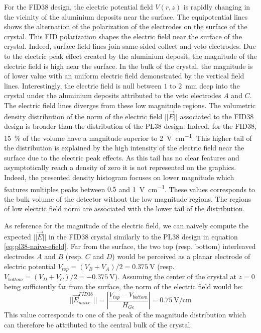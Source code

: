 For the FID38 design, the electric potential field $V(r,z)$ is rapidly changing in the vicinity of the aluminium deposits near the surface. The equipotential lines shows the alternation of the polarization of the electrodes on the surface of the crystal. This FID polarization shapes the electric field near the surface of the crystal. Indeed, surface field lines join same-sided collect and veto electrodes. Due to the electric peak effect created by the aluminium deposit, the magnitude of the electric field is high near the surface. In the bulk of the crystal, the magnitude is of lower value with an uniform electric field demonstrated by the vertical field lines. Interestingly, the electric field is null between $1$ to \SI{2}{\mm} deep into the crystal under the aluminium deposits attributed to the veto electrodes $A$ and $C$. The electric field lines diverges from these low magnitude regions.
The volumetric density distribution of the norm of the electric field $||\vec{E}||$ associated to the FID38 design is broader than the distribution of the PL38 design. Indeed, for the FID38, \SI{15}{\percent} of the volume have a magnitude superior to \SI{2}{\volt\per\cm}. This higher tail of the distribution is explained by the high intensity of the electric field near the surface due to the electric peak effects. As this tail has no clear features and asymptotically reach a density of zero it is not represented on the graphics. Indeed, the presented density histogram focuses on lower magnitude which features multiples peaks between $0.5$ and \SI{1}{\volt\per\cm}. These values corresponds to the bulk volume of the detector without the low magnitude regions. The regions of low electric field norm are associated with the lower tail of the distribution.

As reference for the magnitude of the electric field, we can naively compute the expected $||\vec{E}||$ in the FID38 crystal similarly to the PL38 design in equation \ref{eq:pl38-naive-efield}. Far from the surface, the two top (resp. bottom) interleaved electrodes $A$ and $B$ (resp. $C$ and $D$) would be perceived as a planar electrode of electric potential $V_{top} = (V_B + V_A)/2 = \SI{0.375}{\volt}$ (resp. $V_{bottom} = (V_D + V_C)/2 = -\SI{0.375}{\volt}$). Assuming the center of the crystal at $z=0$ being sufficiently far from the surface, the norm of the electric field would be:
\begin{equation}
\label{eq:fid38-naive-efield}
|| \vec{E}_{naive}^{FID38} || = \left| \frac{V_{top} - V_{bottom}}{H_{Ge}} \right| = \SI{0.75}{\volt\per\cm}
\end{equation}
This value corresponds to one of the peak of the magnitude distribution which can therefore be attributed to the central bulk of the crystal.


